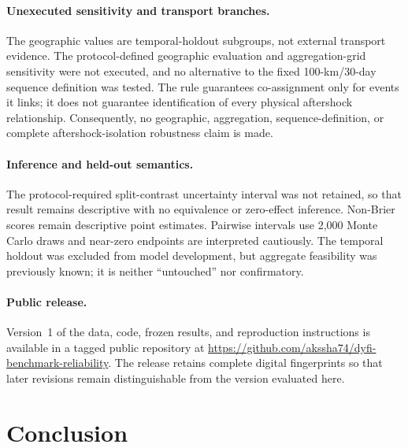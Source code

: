 \documentclass[pdflatex,sn-basic,Numbered]{sn-jnl}
\begin{document}
\paragraph{Unexecuted sensitivity and transport branches.} The geographic
values are temporal-holdout subgroups, not external transport evidence. The
protocol-defined geographic evaluation and aggregation-grid sensitivity were not
executed, and no alternative to the fixed 100-km/30-day sequence definition was
tested. The rule guarantees co-assignment only for events it links; it does not
guarantee identification of every physical aftershock relationship.
Consequently, no geographic, aggregation, sequence-definition, or complete
aftershock-isolation robustness claim is made.

\paragraph{Inference and held-out semantics.} The protocol-required split-contrast
uncertainty interval was not retained, so that result remains descriptive with
no equivalence or zero-effect inference. Non-Brier scores remain descriptive
point estimates. Pairwise intervals use 2{,}000 Monte
Carlo draws and near-zero endpoints are interpreted cautiously. The temporal
holdout was excluded from model development, but aggregate feasibility was
previously known; it is neither ``untouched'' nor confirmatory.

\paragraph{Public release.} Version~1 of the data, code, frozen results, and
reproduction instructions is available in a tagged public repository at
\url{https://github.com/akssha74/dyfi-benchmark-reliability}. The release retains
complete digital fingerprints so that later revisions remain distinguishable
from the version evaluated here.

\section{Conclusion}\label{sec:conclusion}
\end{document}
